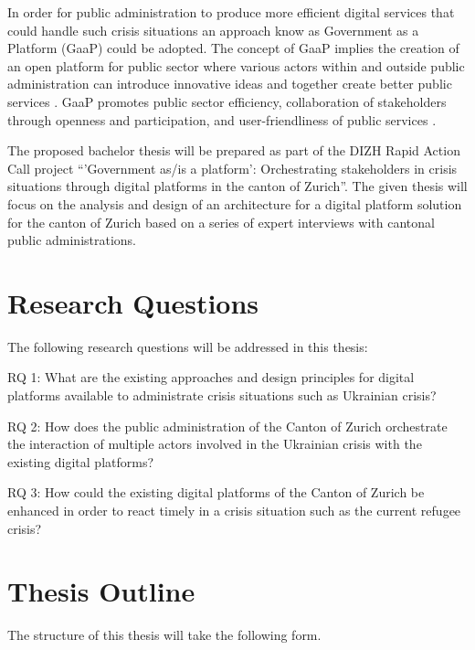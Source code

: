 In order for public administration to produce more efficient digital services that could handle such crisis situations an approach know as Government as a Platform (GaaP) could be adopted. The concept of GaaP implies the creation of an open platform for public sector where various actors within and outside public administration can introduce innovative ideas and together create better public services \citep{Reilly:2011}. GaaP promotes public sector efficiency, collaboration of stakeholders through openness and participation, and user-friendliness of public services \citep{Cordella2019, janssen2013lean}.

The proposed bachelor thesis will be prepared as part of the DIZH Rapid Action Call project “'Government as/is a platform': Orchestrating stakeholders in crisis situations through digital platforms in the canton of Zurich”. The given thesis will focus on the analysis and design of an architecture for a digital platform solution for the canton of Zurich based on a series of expert interviews with cantonal public administrations.

\section{Research Questions}

The following research questions will be addressed in this thesis:

RQ 1: What are the existing approaches and design principles for digital platforms available to administrate crisis situations such as Ukrainian crisis?

RQ 2: How does the public administration of the Canton of Zurich orchestrate the interaction of multiple actors involved in the Ukrainian crisis with the existing digital platforms?

RQ 3: How could the existing digital platforms of the Canton of Zurich be enhanced in order to react timely in a crisis situation such as the current refugee crisis?

\section{Thesis Outline}

The structure of this thesis will take the following form. 